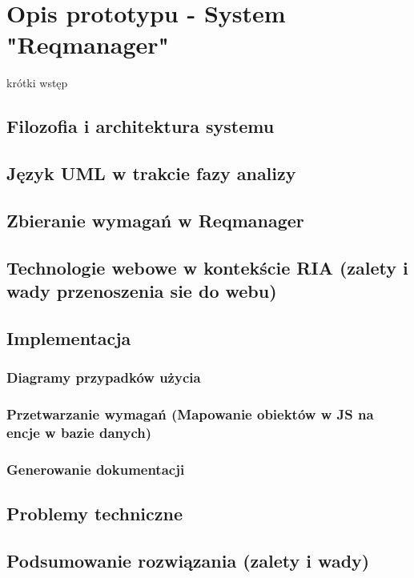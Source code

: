 \chapter{Opis prototypu - System "Reqmanager"}
  
  krótki wstęp

  \section{Filozofia i architektura systemu}

  \section{Język UML w trakcie fazy analizy}

  \section{Zbieranie wymagań w Reqmanager}
  
  \section{Technologie webowe w kontekście RIA (zalety i wady przenoszenia sie do webu)}

  \section{Implementacja}

    \subsection{Diagramy przypadków użycia}
    \subsection{Przetwarzanie wymagań (Mapowanie obiektów w JS na encje w bazie danych)}
    \subsection{Generowanie dokumentacji}

  \section{Problemy techniczne}
  \section{Podsumowanie rozwiązania (zalety i wady)}

